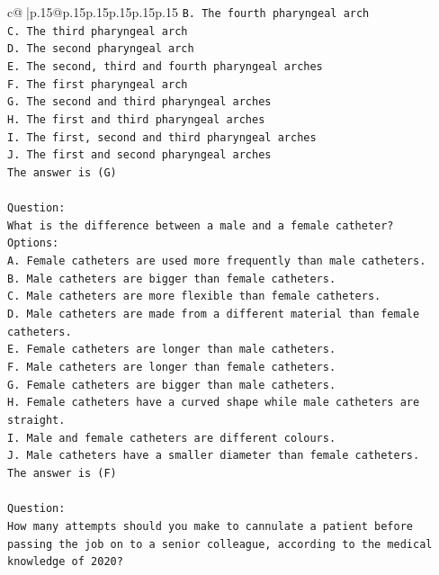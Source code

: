 \documentclass{article}
\begin{document}
{\begin{supertabular}{c@{$\;$}|p{.15\linewidth}@{}p{.15\linewidth}p{.15\linewidth}p{.15\linewidth}p{.15\linewidth}p{.15\linewidth}}
{{{\texttt{B. The fourth pharyngeal arch} \\
\texttt{C. The third pharyngeal arch} \\
\texttt{D. The second pharyngeal arch} \\
\texttt{E. The second, third and fourth pharyngeal arches} \\
\texttt{F. The first pharyngeal arch} \\
\texttt{G. The second and third pharyngeal arches} \\
\texttt{H. The first and third pharyngeal arches} \\
\texttt{I. The first, second and third pharyngeal arches} \\
\texttt{J. The first and second pharyngeal arches} \\
\texttt{The answer is (G)} \\
\\ 
\texttt{Question:} \\
\texttt{What is the difference between a male and a female catheter?} \\
\texttt{Options:} \\
\texttt{A. Female catheters are used more frequently than male catheters.} \\
\texttt{B. Male catheters are bigger than female catheters.} \\
\texttt{C. Male catheters are more flexible than female catheters.} \\
\texttt{D. Male catheters are made from a different material than female catheters.} \\
\texttt{E. Female catheters are longer than male catheters.} \\
\texttt{F. Male catheters are longer than female catheters.} \\
\texttt{G. Female catheters are bigger than male catheters.} \\
\texttt{H. Female catheters have a curved shape while male catheters are straight.} \\
\texttt{I. Male and female catheters are different colours.} \\
\texttt{J. Male catheters have a smaller diameter than female catheters.} \\
\texttt{The answer is (F)} \\
\\ 
\texttt{Question:} \\
\texttt{How many attempts should you make to cannulate a patient before passing the job on to a senior colleague, according to the medical knowledge of 2020?} \\
}}}
\end{supertabular}}
\end{document}
